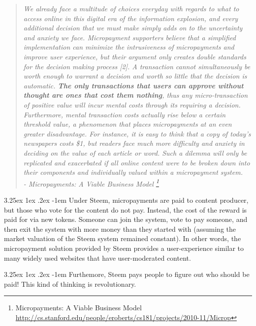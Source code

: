 \documentclass{article}
\makeatletter
\renewcommand\paragraph{\@startsection{paragraph}{5}{\z@}%
  {3.25ex \@plus1ex \@minus.2ex}%
  {-1em}%
  {\normalfont\normalsize\bfseries}}
\makeatother
\begin{document}
            \begin{quote}
                    \textit{We already face a multitude of choices everyday
with regards to what to access online in this digital era of the
information explosion, and every additional decision that we must make
simply adds on to the uncertainty and anxiety we face. Micropayment
supporters believe that a simplified implementation can minimize the
intrusiveness of micropayments and improve user experience, but their
argument only creates double standards for the decision making process [2].
A transaction cannot simultaneously be worth enough to warrant a decision
and worth so little that the decision is automatic. \textbf{The only
transactions that users can approve without thought are ones that cost
them nothing}, thus any micro-transaction of positive value will incur
mental costs through its requiring a decision. Furthermore, mental
transaction costs actually rise below a certain threshold value, a
phenomenon that places micropayments at an even greater disadvantage. For
instance, it is easy to think that a copy of today's newspapers costs \$1,
but readers face much more difficulty and anxiety in deciding on the value
of each article or word. Such a dilemma will only be replicated and
exacerbated if all online content were to be broken down into their
components and individually valued within a micropayment system.}\\

                    \textit{- Micropayments: A Viable Business Model
\footnote{Micropayments: A Viable Business Model\newline
\url{http://cs.stanford.edu/people/eroberts/cs181/projects/2010-11/Microp}}}
            \end{quote}

            \paragraph{}
                Under Steem, micropayments are paid to content producer,
but those who vote for the content do not pay. Instead, the cost of the
reward is paid for via new tokens. Someone can join the system, vote to pay
someone, and then exit the system with more money than they started with
(assuming the market valuation of the Steem system remained constant). In
other words, the micropayment solution provided by Steem provides a
user-experience similar to many widely used websites that have
user-moderated content.

            \paragraph{}
                Furthemore, Steem pays people to figure out who should be
paid! This kind of thinking is revolutionary.
\end{document}
